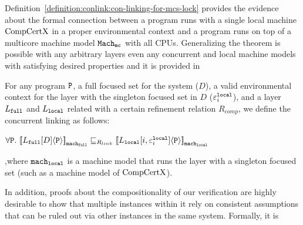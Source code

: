 Definition~\ref{definition:conlink:con-linking-for-mcs-lock} provides the evidence about the formal connection between a program runs with a single local machine $\mathrm{CompCertX}$ in a proper environmental context and a program runs on top of a multicore machine model ${{{{\mathrm{\texttt{Mach}}}}_{\mathrm{\texttt{mc}}}}}$ with all CPUs.
%
%
Generalizing the theorem is possible with any arbitrary layers even  any concurrent and local machine models with satisfying desired properties
and it is provided in 
\begin{definition}
\label{definition:conlink:concurrent-linking}
For any program $ {\mathrm{\texttt{P}}}$, a full focused set for the system ($D$), a valid environmental context for the layer with the singleton focused set in $D$ (${\varepsilon}^{{\mathrm{\texttt{local}}}}_{i}$), and a layer $L_{{\mathrm{\texttt{full}}}}$ and $L_{{\mathrm{\texttt{local}}}}$ related with a certain 
refinement relation $R_{comp}$, we define the concurrent linking as follows:
\begin{center}
$\forall \codeinmath{P}. \ \semwmachine{L_{\codeinmath{full}}[D]}{\codeinmath{P}}{\codeinmath{mach}_{\codeinmath{full}}} \refines_{R_{link}} \semwmachine{\PLayer{L_{\codeinmath{local}}}{i}{\oracle^{\codeinmath{local}}_{i}}}{\codeinmath{P}}{\codeinmath{mach}_{\codeinmath{local}}}$
\end{center}
,where ${\mathrm{\texttt{mach}}}_{{\mathrm{\texttt{local}}}}$ is a machine model that runs the layer with a singleton focused set (such as a machine model of $\mathrm{CompCertX}$).
\end{definition}
{\noindent}
In addition, proofs about the compositionality of our verification are highly desirable to show that multiple instances within it rely on  consistent assumptions that can be ruled out via other instances in the same system.  Formally, it is
